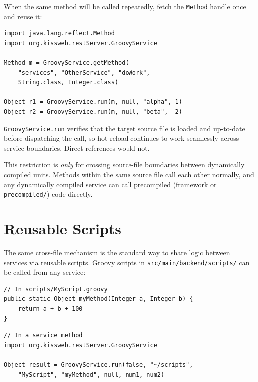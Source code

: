 \noindent
When the same method will be called repeatedly, fetch the \texttt{Method} handle once and reuse it:

\begin{lstlisting}[style=groovy]
import java.lang.reflect.Method
import org.kissweb.restServer.GroovyService

Method m = GroovyService.getMethod(
    "services", "OtherService", "doWork",
    String.class, Integer.class)

Object r1 = GroovyService.run(m, null, "alpha", 1)
Object r2 = GroovyService.run(m, null, "beta",  2)
\end{lstlisting}

\begin{notebox}
\texttt{GroovyService.run} verifies that the target source file is loaded and up-to-date before dispatching the call, so hot reload continues to work seamlessly across service boundaries.  Direct references would not.
\end{notebox}

\begin{tipbox}
This restriction is \emph{only} for crossing source-file boundaries between dynamically compiled units.  Methods within the same source file call each other normally, and any dynamically compiled service can call precompiled (framework or \texttt{precompiled/}) code directly.
\end{tipbox}

\section{Reusable Scripts}
\label{sec:svc-scripts}

The same cross-file mechanism is the standard way to share logic between services via reusable scripts.  Groovy scripts in \texttt{src/main/backend/scripts/} can be called from any service:

\begin{lstlisting}[style=groovy]
// In scripts/MyScript.groovy
public static Object myMethod(Integer a, Integer b) {
    return a + b + 100
}
\end{lstlisting}

\begin{lstlisting}[style=groovy]
// In a service method
import org.kissweb.restServer.GroovyService

Object result = GroovyService.run(false, "~/scripts",
    "MyScript", "myMethod", null, num1, num2)
\end{lstlisting}


